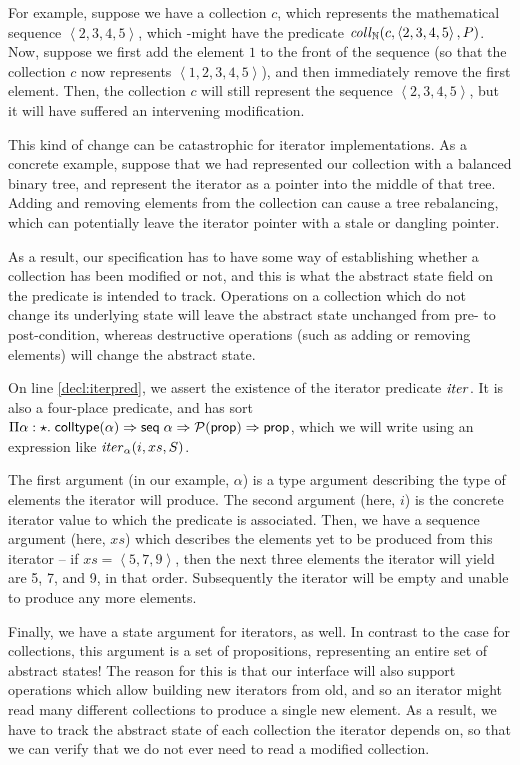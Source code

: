 For example, suppose we have a collection $c$, which represents the
mathematical sequence $\left<2, 3, 4, 5\right>$, which -might have the
predicate $\mathit{coll}_{\mathbb{N}}(c, \left<2, 3, 4, 5\right>, P)$.  Now, suppose
we first add the element $1$ to the front of the sequence (so that the
collection $c$ now represents $\left<1, 2, 3, 4, 5\right>$), and then
immediately remove the first element. Then, the collection $c$ will
still represent the sequence $\left<2, 3, 4, 5\right>$, but it will
have suffered an intervening modification.

This kind of change can be catastrophic for iterator implementations.
As a concrete example, suppose that we had represented our collection
with a balanced binary tree, and represent the iterator as a pointer
into the middle of that tree. Adding and removing elements from the
collection can cause a tree rebalancing, which can potentially leave
the iterator pointer with a stale or dangling pointer.

As a result, our specification has to have some way of establishing
whether a collection has been modified or not, and this is what the
abstract state field on the predicate is intended to track. Operations
on a collection which do not change its underlying state will leave
the abstract state unchanged from pre- to post-condition, whereas
destructive operations (such as adding or removing elements) will
change the abstract state.

On line \ref{decl:iterpred}, we assert the existence of the iterator predicate
$\mathit{iter}$.  It is also a four-place predicate, and has sort $\Pi
\alpha:\star.\; \mathsf{colltype}(\alpha) \Rightarrow \mathsf{seq}\;{\alpha} \Rightarrow
\mathcal{P}(\mathsf{prop}) \Rightarrow \mathsf{prop}$, which we will write using an
expression like $\mathit{iter}_\alpha(i, xs, S)$.

The first argument (in our example, $\alpha$) is a type argument
describing the type of elements the iterator will produce. The second
argument (here, $i$) is the concrete iterator value to which the
predicate is associated. Then, we have a sequence argument (here,
$xs$) which describes the elements yet to be produced from this
iterator -- if $xs = \left<5, 7, 9\right>$, then the next three
elements the iterator will yield are 5, 7, and 9, in that order.
Subsequently the iterator will be empty and unable to produce any
more elements.

Finally, we have a state argument for iterators, as well. In contrast
to the case for collections, this argument is a set of propositions,
representing an entire set of abstract states! The reason for this is
that our interface will also support operations which allow building
new iterators from old, and so an iterator might read many different
collections to produce a single new element. As a result, we have to
track the abstract state of each collection the iterator depends on,
so that we can verify that we do not ever need to read a modified
collection.

